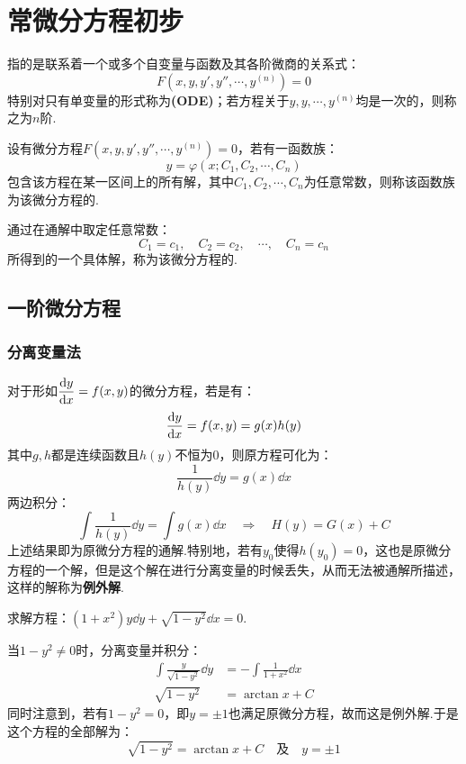 \chapter{常微分方程初步}
\begin{definition}
    指的是联系着一个或多个自变量与函数及其各阶微商的关系式：
    \[F(x,y,y',y'',\cdots,y^{(n)}) = 0\]
    特别对只有单变量的形式称为\textbf{(ODE)}；若方程关于$y,y,\cdots,y^{(n)}$均是一次的，则称之为$n$阶.
\end{definition}

\begin{definition}
    设有微分方程$F(x,y,y',y'',\cdots,y^{(n)}) = 0$，若有一函数族：
    \[y = \varphi(x;C_1,C_2,\cdots,C_n)\]
    包含该方程在某一区间上的所有解，其中$C_1,C_2,\cdots,C_n$为任意常数，则称该函数族为该微分方程的.

    通过在通解中取定任意常数：
    \[C_1 = c_1,\quad C_2=c_2,\quad \cdots, \quad C_n=c_n\]
    所得到的一个具体解，称为该微分方程的.
\end{definition}

\section{一阶微分方程}
\subsection{分离变量法}
对于形如$\displaystyle\dv{y}{x}=f(x,y)$的微分方程，若是有：
\[\dv{y}{x} = f(x,y) = g(x)h(y)\]
其中$g,h$都是连续函数且$h(y)$不恒为$0$，则原方程可化为：
\[\frac{1}{h(y)}\dd{y} = g(x)\dd{x}\]
两边积分：
\[\int\frac{1}{h(y)}\dd{y} = \int g(x)\dd{x} \quad\Rightarrow\quad H(y) = G(x) + C\]
上述结果即为原微分方程的通解.特别地，若有$y_0$使得$h(y_0) = 0$，这也是原微分方程的一个解，但是这个解在进行分离变量的时候丢失，从而无法被通解所描述，这样的解称为\textbf{例外解}.

\begin{question}
    求解方程：$(1+x^2)y\dd{y} + \sqrt{1-y^2}\dd{x} = 0$.
\end{question}

\begin{solution}
    当$1-y^2 \neq 0$时，分离变量并积分：
    \begin{align*}
        \int\frac{y}{\sqrt{1-y^2}}\dd{y} &= -\int\frac{1}{1+x^2}\dd{x}\\
        \sqrt{1-y^2} &= \arctan x + C
    \end{align*}
    同时注意到，若有$1-y^2=0$，即$y=\pm1$也满足原微分方程，故而这是例外解.于是这个方程的全部解为：
    \[\sqrt{1-y^2} = \arctan x + C \quad\text{及}\quad y = \pm 1\]
\end{solution}


